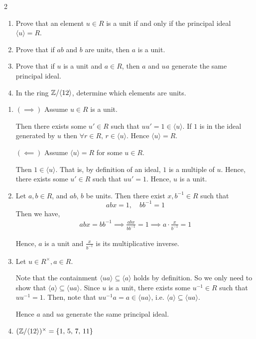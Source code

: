\documentclass[Notebook.tex]{subfiles}
\begin{document}
\newpage

\begin{problem}{2}
    \begin{enumerate}[label=(\alph*),ref=\theenumi\alph*]
		\item Prove that an element $u \in R$ is a unit if and only if the principal ideal $\langle u \rangle = R$.
		\item Prove that if $ab$ and $b$ are units, then $a$ is a unit.
		\item Prove that if $u$ is a unit and $a \in R$, then $a$ and $ua$ generate the same principal ideal.
		\item In the ring $\mathbb Z/ \langle 12 \rangle$, determine which elements are units.
	\end{enumerate}
\end{problem}

\begin{solution}
    \bbni 
    \begin{enumerate}[label=(\alph*),ref=\theenumi\alph*]
        \item $(\implies)$ Assume $u \in R$ is a unit. 
        
        Then there exists some $u' \in R$ such that $uu' = 1 \in \langle u\rangle$. If $1$ is in the ideal generated by $u$ then $\forall r \in R, \, r \in \langle u \rangle$. Hence $\langle u \rangle = R$.  
        
        $(\impliedby)$ Assume $\langle u \rangle = R$ for some $u \in R$. 
        
        Then $1 \in \langle u \rangle$. That is, by definition of an ideal, $1$ is a multiple of $u$. Hence, there exists some $u' \in R$ such that $uu' =1$. Hence, $u$ is a unit.  

        \item  Let $a, b \in R$, and $ab, \, b$ be units. Then there exist $x, b^{-1} \in R$ such that 
        \[abx = 1, \quad bb^{-1} = 1\]
        Then we have, 
        \begin{align*}
            abx = bb^{-1} \implies 
            \frac{abx}{bb^{-1}} = 1  \implies 
            a \cdot \frac{x}{b^{-1}} = 1
        \end{align*}

         Hence, $a$ is a unit and $\frac{x}{b^{-1}}$ is its multiplicative inverse.

        \item  Let $u \in R^\times, a \in R$.  
        
      

        Note that the containment $\langle ua \rangle \subseteq \langle a \rangle$ holds by definition. So we only need to show that 
        $\langle a \rangle \subseteq \langle ua \rangle$. Since $u$ is a unit, there exists some $u^{-1} \in R$ such that $uu^{-1} =1$. Then, note that $uu^{-1}a = a \in \langle ua \rangle$, i.e. $\langle a \rangle \subseteq \langle ua \rangle$. 

        Hence $a$ and $ua$ generate the same principal ideal. 

        \item  $(\mathbb Z/\langle 12 \rangle)^\times  = \{1, \, 5, \, 7, \, 11\}$
    \end{enumerate}
\end{solution}
\end{document}
